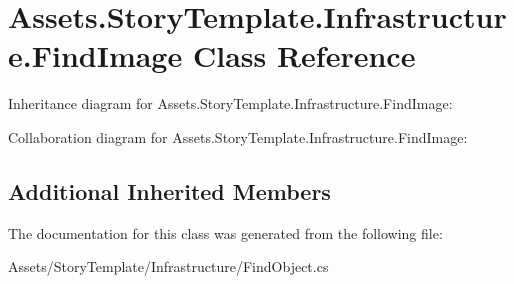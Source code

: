 \hypertarget{classAssets_1_1StoryTemplate_1_1Infrastructure_1_1FindImage}{}\section{Assets.\+Story\+Template.\+Infrastructure.\+Find\+Image Class Reference}
\label{classAssets_1_1StoryTemplate_1_1Infrastructure_1_1FindImage}


Inheritance diagram for Assets.\+Story\+Template.\+Infrastructure.\+Find\+Image\+:


Collaboration diagram for Assets.\+Story\+Template.\+Infrastructure.\+Find\+Image\+:
\subsection*{Additional Inherited Members}


The documentation for this class was generated from the following file\+:\begin{DoxyCompactItemize}
\item 
Assets/\+Story\+Template/\+Infrastructure/Find\+Object.\+cs\end{DoxyCompactItemize}
